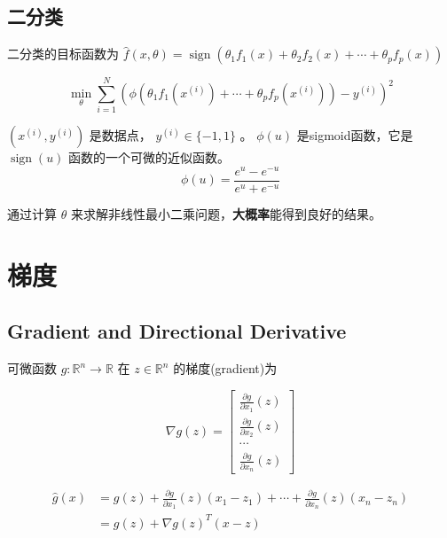 \subsection{二分类}

二分类的目标函数为 $ \hat{f}(x, \theta)=\operatorname{sign}\left(\theta_{1} f_{1}(x)+\theta_{2} f_{2}(x)+\cdots+\theta_{p} f_{p}(x)\right) $ 


\begin{problem}[二分类问题]
    $$
\min _{\theta} \sum_{i=1}^{N}\left(\phi\left(\theta_{1} f_{1}\left(x^{(i)}\right)+\cdots+\theta_{p} f_{p}\left(x^{(i)}\right)\right)-y^{(i)}\right)^{2}
$$

$ \left(x^{(i)}, y^{(i)}\right) $ 是数据点， $ y^{(i)} \in\{-1,1\} $ 。 $ \phi(u) $ 是sigmoid函数，它是 $\operatorname{sign} (u) $ 函数的一个可微的近似函数。
$$
\phi(u)=\frac{e^{u}-e^{-u}}{e^{u}+e^{-u}}
$$
\end{problem}


通过计算 $ \theta $ 来求解非线性最小二乘问题，\textbf{大概率}能得到良好的结果。



\section{梯度}

\subsection{Gradient and Directional Derivative}

\begin{definition}
    可微函数 $ g: \mathbb{R}^{n} \rightarrow \mathbb{R} $ 在 $ z \in \mathbb{R}^{n} $ 的梯度(gradient)为

$$
\nabla g(z)=\left[\begin{array}{c}
\frac{\partial g}{\partial x_{1}}(z) \\
\frac{\partial g}{\partial x_{2}}(z) \\
\cdots \\
\frac{\partial g}{\partial x_{n}}(z)
\end{array}\right]
$$
\end{definition}

\begin{definition}
    $$ \begin{aligned} \hat{g}(x) &=g(z)+\frac{\partial g}{\partial x_{1}}(z)\left(x_{1}-z_{1}\right)+\cdots+\frac{\partial g}{\partial x_{n}}(z)\left(x_{n}-z_{n}\right) \\ &=g(z)+\nabla g(z)^{T}(x-z) \end{aligned} $$
\end{definition}

